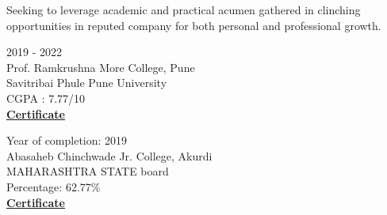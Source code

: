 \documentclass[letterpaper,10pt]{memoir} %
\begin{document}
\userinformation %

\framebreak %






{Seeking to leverage academic and practical acumen gathered in clinching opportunities in reputed company for both personal and professional growth.}\\





{2019 - 2022}\\
{Prof. Ramkrushna More College, Pune}\\
{Savitribai Phule Pune University}\\
CGPA : 7.77/10\\
\textbf{\href{https://drive.google.com/file/d/1Y_d1f7XW1VYKLRC9zUc6Hj5_W-hmOaE0/view?usp=sharing}{Certificate}}\\





{Year of completion: 2019}\\
{Abasaheb Chinchwade Jr. College, Akurdi}\\
{MAHARASHTRA STATE board}\\
Percentage: 62.77\% \\
\textbf{\href{https://drive.google.com/drive/u/0/folders/10_GHjB540w3rGgFYKoydtyAJAjgOLdYw}{Certificate}}\\
\end{document}
